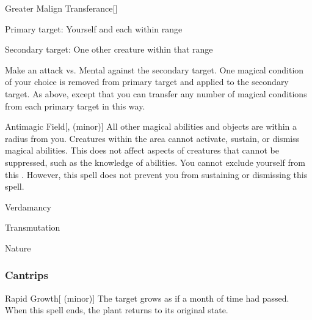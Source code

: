 \lowercase{\hypertarget{spell:Greater Malign Transferance}{}}\label{spell:Greater Malign Transferance}
\begin{freeability}[\nth{5}]{\hypertarget{spell:Greater Malign Transferance}{Greater Malign Transferance}}[]

Primary target: Yourself and each  within \rngmed range
\par\noindent
Secondary target: One other creature within that range

Make an attack vs. Mental against the secondary target.
\hit One magical condition of your choice is removed from primary target and applied to the secondary target.
\crit As above, except that you can transfer any number of magical conditions from each primary target in this way.
\end{freeability}
\vspace{0.25em}



\lowercase{\hypertarget{spell:Antimagic Field}{}}\label{spell:Antimagic Field}
\begin{freeability}[\nth{7}]{\hypertarget{spell:Antimagic Field}{Antimagic Field}}[,  (minor)]
All other magical abilities and objects are  within a \areamed radius  from you.
Creatures within the area cannot activate, sustain, or dismiss magical abilities.
This does not affect aspects of creatures that cannot be suppressed, such as the knowledge of abilities.
You cannot exclude yourself from this .
However, this spell does not prevent you from sustaining or dismissing this spell.
\end{freeability}
\vspace{0.25em}


\newpage
\begin{spellsection}{Verdamancy}

\begin{spellheader}
\end{spellheader}


 Transmutation

 Nature

\subsubsection{Cantrips}


\begin{freeability}{Rapid Growth}[ (minor)]
The target grows as if a month of time had passed.
When this spell ends, the plant returns to its original state.
\end{freeability}

\end{spellsection}


